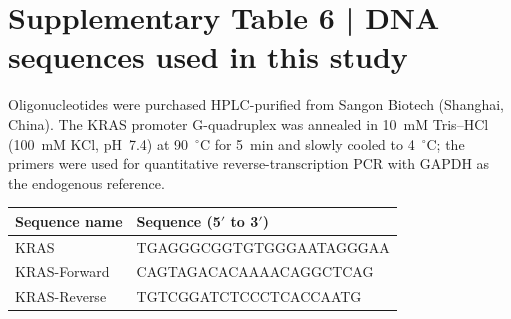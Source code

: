 \section*{Supplementary Table 6 | DNA sequences used in this study}
Oligonucleotides were purchased HPLC-purified from Sangon Biotech (Shanghai, China). The KRAS promoter G-quadruplex was annealed in 10~mM Tris--HCl (100~mM KCl, pH~7.4) at 90~$^\circ$C for 5~min and slowly cooled to 4~$^\circ$C; the primers were used for quantitative reverse-transcription PCR with GAPDH as the endogenous reference.
\begin{center}\footnotesize
\setlength{\tabcolsep}{6pt}
\begin{tabular}{@{}ll@{}}
\toprule
\textbf{Sequence name} & \textbf{Sequence (5$'$ to 3$'$)} \\
\midrule
KRAS                & TGAGGGCGGTGTGGGAATAGGGAA \\
KRAS-Forward        & CAGTAGACACAAAACAGGCTCAG \\
KRAS-Reverse        & TGTCGGATCTCCCTCACCAATG \\
\bottomrule
\end{tabular}
\end{center}
